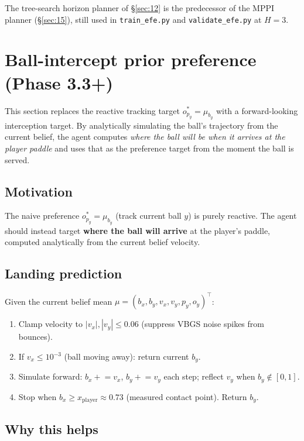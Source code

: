 \documentclass[12pt, a4paper]{article}
\newcommand{\1}{\mathbf{1}}
\newcommand{\code}[1]{\texttt{#1}}
\begin{document}
The tree-search horizon planner of \S\ref{sec:12} is the predecessor of the MPPI
planner (\S\ref{sec:15}), still used in \code{train\_efe.py} and
\code{validate\_efe.py} at $H=3$.

\section{Ball-intercept prior preference (Phase 3.3+)}
\label{sec:13}

This section replaces the reactive tracking target $o^*_{p_y} = \mu_{b_y}$ with
a forward-looking interception target.  By analytically simulating the ball's
trajectory from the current belief, the agent computes \textit{where the ball
will be when it arrives at the player paddle} and uses that as the preference
target from the moment the ball is served.

\subsection{Motivation}

The naive preference $o^*_{p_y} = \mu_{b_y}$ (track current ball $y$) is purely
reactive.  The agent should instead target \textbf{where the ball will arrive}
at the player's paddle, computed analytically from the current belief velocity.

\subsection{Landing prediction}

Given the current belief mean
$\mu = (b_x, b_y, v_x, v_y, p_y, o_y)^\top$:
\begin{enumerate}
  \item Clamp velocity to $|v_x|, |v_y| \le 0.06$ (suppress VBGS noise spikes
    from bounces).
  \item If $v_x \le 10^{-3}$ (ball moving away): return current $b_y$.
  \item Simulate forward: $b_x \mathrel{+}= v_x$, $b_y \mathrel{+}= v_y$ each
    step; reflect $v_y$ when $b_y \notin [0,1]$.
  \item Stop when $b_x \ge x_\text{player} \approx 0.73$ (measured contact
    point).  Return $b_y$.
\end{enumerate}

\subsection{Why this helps}
\end{document}
